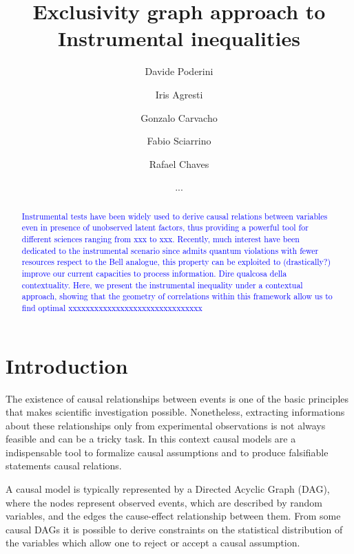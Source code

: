 \documentclass[
    nofootinbin,
    floatfix,
    amsfonts,
    twocolumn, 
    aps, 
    prl]{revtex4-1}
\begin{document}
\title{Exclusivity graph approach to Instrumental inequalities}

\author{Davide Poderini}
\author{Iris Agresti}
\author{Gonzalo Carvacho}
\author{Fabio Sciarrino}

\author{Rafael Chaves}
\author{...}

\begin{abstract}
   \textcolor{blue}{Instrumental tests have been widely used to derive causal relations between variables even in presence of unobserved latent factors, thus providing a powerful tool for different sciences ranging from xxx to xxx. Recently, much interest have been dedicated to the instrumental scenario since admits quantum violations with fewer resources respect to the Bell analogue, this property can be exploited to (drastically?) improve our current capacities to process information. Dire qualcosa della contextuality. Here, we present the instrumental inequality under a contextual approach, showing that the geometry of correlations within this framework allow us to find optimal xxxxxxxxxxxxxxxxxxxxxxxxxxxxxxx  }  
\end{abstract}

\maketitle
\section*{Introduction}
The existence of causal relationships between events is one of the basic
principles that makes scientific investigation possible.
Nonetheless, extracting informations about these relationships only from
experimental observations is not always feasible and can be a tricky task.
In this context causal models are a indispensable tool to formalize causal
assumptions and to produce falsifiable statements causal relations. %

A causal model is typically represented by a Directed Acyclic Graph (DAG), where
the nodes represent observed events, which are described by random variables,
and the edges the cause-effect relationship between them.
From some causal DAGs it is possible to derive constraints on the statistical
distribution of the variables which allow one to reject or accept a causal
assumption. %
\end{document}
